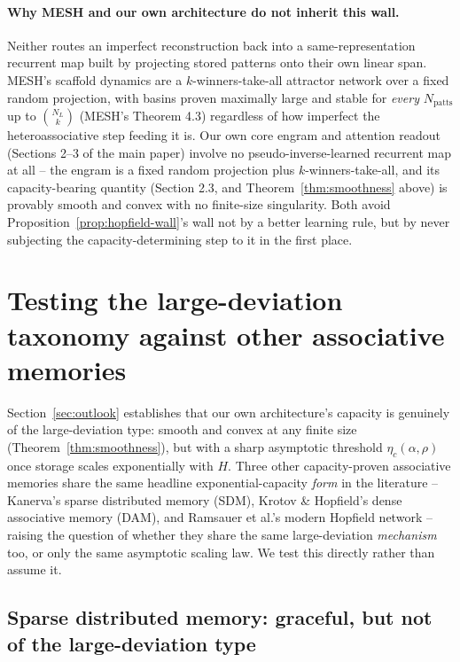 \documentclass[11pt]{article}
\begin{document}
\paragraph{Why MESH and our own architecture do not inherit this wall.} Neither routes an
imperfect reconstruction back into a same-representation recurrent map built by projecting stored
patterns onto their own linear span. MESH's scaffold dynamics are a $k$-winners-take-all attractor
network over a fixed random projection, with basins proven maximally large and stable for
\emph{every} $N_{\mathrm{patts}}$ up to $\binom{N_L}{k}$ (MESH's Theorem 4.3) regardless of how
imperfect the heteroassociative step feeding it is. Our own core engram and attention readout
(Sections 2--3 of the main paper) involve no pseudo-inverse-learned recurrent map at all -- the
engram is a fixed random projection plus $k$-winners-take-all, and its capacity-bearing quantity
(Section 2.3, and Theorem~\ref{thm:smoothness} above) is provably smooth and convex with no
finite-size singularity. Both avoid Proposition~\ref{prop:hopfield-wall}'s wall not by a better
learning rule, but by never subjecting the capacity-determining step to it in the first place.

\section{Testing the large-deviation taxonomy against other associative memories}
\label{sec:other-models}

Section~\ref{sec:outlook} establishes that our own architecture's capacity is genuinely of the
large-deviation type: smooth and convex at any finite size (Theorem~\ref{thm:smoothness}), but
with a sharp asymptotic threshold $\eta_c(\alpha,\rho)$ once storage scales exponentially with
$H$. Three other capacity-proven associative memories share the same headline
exponential-capacity \emph{form} in the literature -- Kanerva's sparse distributed memory (SDM),
Krotov \& Hopfield's dense associative memory (DAM), and Ramsauer et al.'s modern Hopfield
network -- raising the question of whether they share the same large-deviation \emph{mechanism}
too, or only the same asymptotic scaling law. We test this directly rather than assume it.

\subsection{Sparse distributed memory: graceful, but not of the large-deviation type}
\label{sec:sdm-analysis}
\end{document}
